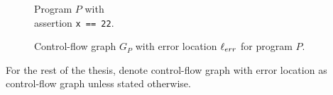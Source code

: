 \begin{center}
	\begin{minipage}[b]{0.4\linewidth}
		\begin{figure}[H]
			\centering
			
			\caption{Program $P$ with \\ assertion \texttt{x == 22}.}
			\label{codeWithAss}
		\end{figure}
	\end{minipage}
	\hfill
	\begin{minipage}[b]{0.59\linewidth}
		\begin{figure}[H]
			\centering
			
			\caption{Control-flow graph $G_P$ with error location $\ell_{err}$ for program $P$.}
			\label{cfg:P:Ass}
		\end{figure}
	\end{minipage}
\end{center}
For the rest of the thesis, denote control-flow graph with error location as control-flow graph unless stated otherwise.
